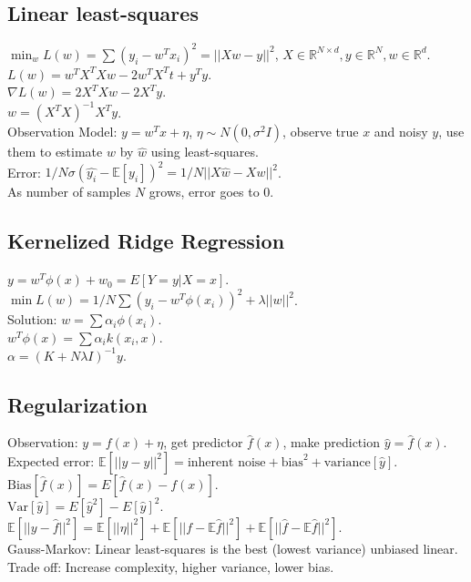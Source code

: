 \subsection*{Linear least-squares}

$\min_w L(w) = \sum (y_i - w^T x_i)^2 = ||X w - y||^2$, $X \in \mathbb{R}^{N \times d}, y \in \mathbb{R}^N, w \in \mathbb{R}^d$.\\
$L(w) = w^T X^T X w - 2 w^T X^T t + y^T y$.\\
$\nabla L(w) = 2 X^T X w - 2 X^T y$.\\
$w = (X^T X)^{-1} X^T y$.\\
Observation Model: $y = w^T x + \eta$, $\eta \sim N(0, \sigma^2 I)$, observe true $x$ and noisy $y$, use them to estimate $w$ by $\hat{w}$ using least-squares.\\
Error: $1/N \sigma(\hat{y_i} - \mathbb{E}[y_i])^2 = 1/N ||X\hat{w} - Xw||^2$.\\
As number of samples $N$ grows, error goes to 0.

\subsection*{Kernelized Ridge Regression}

$y = w^T \phi(x) + w_0 = E[Y=y | X=x]$.\\
$\min L(w) = 1/N \sum(y_i - w^T \phi(x_i))^2 + \lambda ||w||^2$.\\
Solution: $w = \sum \alpha_i \phi(x_i)$.\\
$w^T \phi(x) = \sum \alpha_i k(x_i, x)$.\\
$\alpha = (K + N \lambda I)^{-1}y$.

\subsection*{Regularization}

Observation: $y = f(x) + \eta$, get predictor $\hat{f}(x)$, make prediction $\hat{y} = \hat{f}(x)$.\\
Expected error: $\mathbb{E}[||y - \hat{y}||^2] = \text{inherent noise} + \text{bias}^2 + \text{variance}[\hat{y}]$.\\
$\text{Bias}[\hat{f}(x)] = E[\hat{f}(x) - f(x)]$.\\
$\text{Var}[\hat{y}] = E[\hat{y}^2] - E[\hat{y}]^2$.\\
$\mathbb{E}[||y - \hat{f}||^2] = \mathbb{E}[||\eta||^2] + \mathbb{E}[||f - \mathbb{E}\hat{f}||^2] + \mathbb{E}[||\hat{f} - \mathbb{E}\hat{f}||^2]$.\\
Gauss-Markov: Linear least-squares is the best (lowest variance) unbiased linear.\\
Trade off: Increase complexity, higher variance, lower bias.

